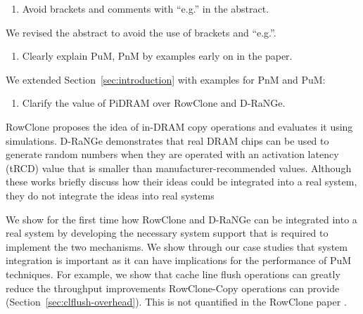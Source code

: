 \bigbreak
\begin{tcolorbox}
    \begin{enumerate}[label=R4/\arabic*]
        \addtocounter{enumi}{2}
        \item \label{q:r4q3} Avoid brackets and comments with ``e.g.'' in the abstract. 
    \end{enumerate}
\end{tcolorbox} 

We revised the abstract to avoid the use of brackets and “e.g.”.

\newpage

\bigbreak
\begin{tcolorbox}
    \begin{enumerate}[label=R4/\arabic*]
        \addtocounter{enumi}{3}
        \item \label{q:r4q4} Clearly explain PuM, PnM by examples early on in the paper.
    \end{enumerate}
\end{tcolorbox} 

We extended Section~\ref{sec:introduction} with examples for PnM and PuM:

\vspace{5pt}
\yyboxbegin
{}
\yyboxend 

\bigbreak
\begin{tcolorbox}
    \begin{enumerate}[label=R4/\arabic*]
        \addtocounter{enumi}{4}
        \item \label{q:r4q5} Clarify the value of PiDRAM over RowClone and D-RaNGe.
    \end{enumerate}
\end{tcolorbox} 

RowClone proposes the idea of in-DRAM copy operations and evaluates it using simulations. D-RaNGe demonstrates that real DRAM chips can be used to generate random numbers when they are operated with an activation latency (tRCD) value that is smaller than manufacturer-recommended values. Although these works briefly discuss how their ideas could be integrated into a real system, they do not integrate the ideas into real systems 

We show for the first time how RowClone and D-RaNGe can be integrated into a real system by developing the necessary system support that is required to implement the two mechanisms. We show through our case studies that system integration is important as it can have implications for the performance of PuM techniques. For example, we show that cache line flush operations can greatly reduce the throughput improvements RowClone-Copy operations can provide (Section~\ref{sec:clflush-overhead}). This is not quantified in the RowClone paper .

